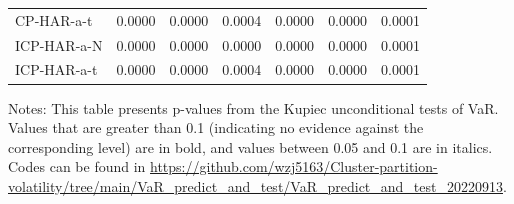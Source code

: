 \documentclass[preprint,12pt,authoryear]{elsarticle}
\begin{document}
\begin{center}
\begin{threeparttable}
\begin{tabular}{l c c c c c c}
CP-HAR-a-t            & 0.0000          & 0.0000          & 0.0004 & 0.0000          & 0.0000          & 0.0001 \\
ICP-HAR-a-N           & 0.0000          & 0.0000          & 0.0000 & 0.0000          & 0.0000          & 0.0001 \\
ICP-HAR-a-t           & 0.0000          & 0.0000          & 0.0004 & 0.0000          & 0.0000          & 0.0001 \\
\bottomrule
\end{tabular}
Notes: This table presents p-values from the Kupiec unconditional tests of VaR. Values that are greater than 0.1 (indicating no evidence against the corresponding level) are in bold, and values between 0.05 and 0.1 are in italics.
Codes can be found in \url{https://github.com/wzj5163/Cluster-partition-volatility/tree/main/VaR_predict_and_test/VaR_predict_and_test_20220913}.
\end{threeparttable}
\end{center}
\end{document}
